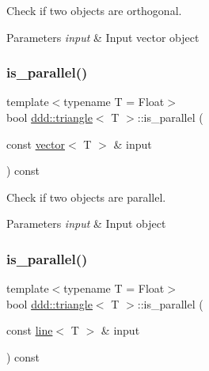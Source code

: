Check if two objects are orthogonal. 


\begin{DoxyParams}{Parameters}
{\em input} & Input vector object \\
\hline
\end{DoxyParams}
\mbox{\label{classddd_1_1triangle_ad12c87bf60bd5754643a430e3849332e}} 
\subsubsection{\texorpdfstring{is\+\_\+parallel()}{is\_parallel()}\hspace{0.1cm}{\footnotesize\ttfamily [1/5]}}
{\footnotesize\ttfamily template$<$typename T = Float$>$ \\
bool \hyperlink{classddd_1_1triangle}{ddd\+::triangle}$<$ T $>$\+::is\+\_\+parallel (\begin{DoxyParamCaption}\item[{const \hyperlink{classddd_1_1vector}{vector}$<$ T $>$ \&}]{input }\end{DoxyParamCaption}) const\hspace{0.3cm}{\ttfamily [inline]}}



Check if two objects are parallel. 


\begin{DoxyParams}{Parameters}
{\em input} & Input object \\
\hline
\end{DoxyParams}
\mbox{\label{classddd_1_1triangle_a49f8deab2e4e94b563f92a9c8d752fe8}} 
\subsubsection{\texorpdfstring{is\+\_\+parallel()}{is\_parallel()}\hspace{0.1cm}{\footnotesize\ttfamily [2/5]}}
{\footnotesize\ttfamily template$<$typename T = Float$>$ \\
bool \hyperlink{classddd_1_1triangle}{ddd\+::triangle}$<$ T $>$\+::is\+\_\+parallel (\begin{DoxyParamCaption}\item[{const \hyperlink{classddd_1_1line}{line}$<$ T $>$ \&}]{input }\end{DoxyParamCaption}) const\hspace{0.3cm}{\ttfamily [inline]}}



